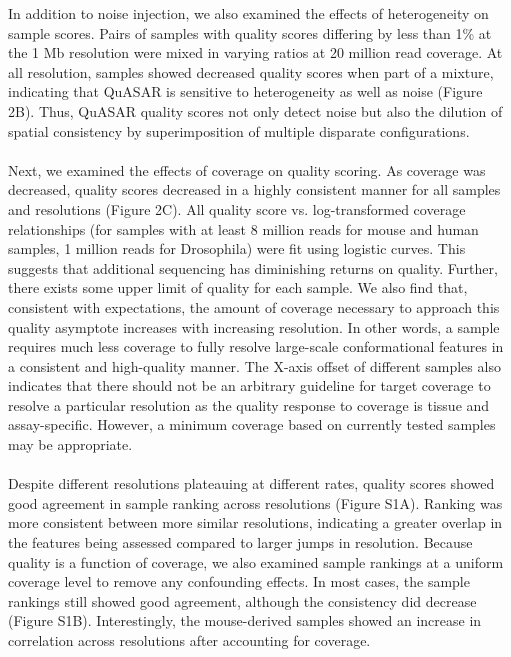 In addition to noise injection, we also examined the effects of heterogeneity on sample scores. Pairs of samples with quality scores differing by less than 1\% at the 1 Mb resolution were mixed in varying ratios at 20 million read coverage. At all resolution, samples showed decreased quality scores when part of a mixture, indicating that QuASAR is sensitive to heterogeneity as well as noise (Figure 2B). Thus, QuASAR quality scores not only detect noise but also the dilution of spatial consistency by superimposition of multiple disparate configurations.
\\\\
Next, we examined the effects of coverage on quality scoring. As coverage was decreased, quality scores decreased in a highly consistent manner for all samples and resolutions (Figure 2C). All quality score vs. log-transformed coverage relationships (for samples with at least 8 million reads for mouse and human samples, 1 million reads for Drosophila) were fit using logistic curves. This suggests that additional sequencing has diminishing returns on quality. Further, there exists some upper limit of quality for each sample. We also find that, consistent with expectations, the amount of coverage necessary to approach this quality asymptote increases with increasing resolution. In other words, a sample requires much less coverage to fully resolve large-scale conformational features in a consistent and high-quality manner. The X-axis offset of different samples also indicates that there should not be an arbitrary guideline for target coverage to resolve a particular resolution as the quality response to coverage is tissue and assay-specific. However, a minimum coverage based on currently tested samples may be appropriate.
\\\\
Despite different resolutions plateauing at different rates, quality scores showed good agreement in sample ranking across resolutions (Figure S1A). Ranking was more consistent between more similar resolutions, indicating a greater overlap in the features being assessed compared to larger jumps in resolution. Because quality is a function of coverage, we also examined sample rankings at a uniform coverage level to remove any confounding effects. In most cases, the sample rankings still showed good agreement, although the consistency did decrease (Figure S1B). Interestingly, the mouse-derived samples showed an increase in correlation across resolutions after accounting for coverage.
\\\\
